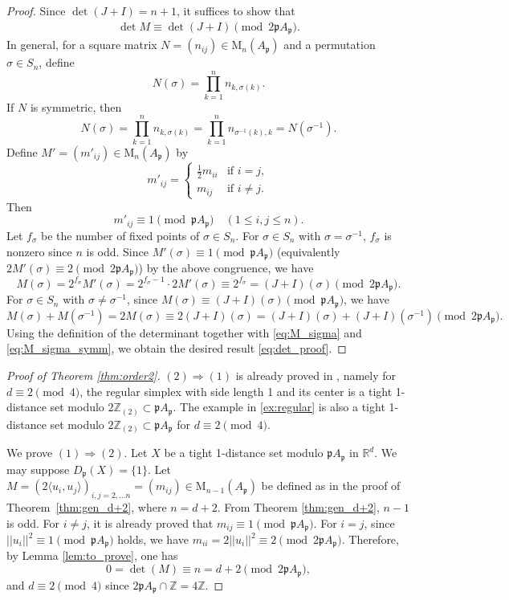\documentclass[a4paper, 11pt]{article}
\newcommand{\R}{\mathbb{R}}
\newcommand{\Z}{\mathbb{Z}}
\newcommand{\p}{\mathfrak{p}}
\newcommand{\la}{\langle}
\newcommand{\ra}{\rangle}
\theoremstyle{definition}
\begin{document}
\begin{proof}
Since $\det(J + I) = n + 1$, it suffices to show that
\begin{align}
\det M \equiv \det(J + I) \pmod{2\p A_{\p}}.
\label{eq:det_proof}
\end{align}
In general, for a square matrix $N = (n_{ij}) \in \mathrm{M}_n(A_{\p})$ and a permutation $\sigma \in S_n$, define
\[
N(\sigma) = \prod_{k=1}^n n_{k,\sigma(k)}.
\]
If $N$ is symmetric, then 
\[
N(\sigma)=\prod_{k=1}^n n_{k,\sigma(k)}
=\prod_{k=1}^n n_{\sigma^{-1}(k),k}=N(\sigma^{-1}).
\]
Define $M' = (m'_{ij}) \in \mathrm{M}_n(A_{\p})$ by
\[
m'_{ij} =
\begin{cases}
\frac{1}{2} m_{ii} & \text{if } i = j,\\
m_{ij} & \text{if } i \ne j. 
\end{cases}
\]
Then
\[
m'_{ij} \equiv 1 \pmod{\p A_{\p}} \quad (1 \leq i, j \leq n).
\]
Let $f_{\sigma}$ be the number of fixed points of $\sigma \in S_n$. 
For $\sigma \in S_n$ with $\sigma = \sigma^{-1}$, $f_{\sigma}$ is nonzero since $n$ is odd. Since $M'(\sigma) \equiv 1 \pmod{\p A_{\p}}$ (equivalently $2M'(\sigma) \equiv 2 \pmod{2\p A_{\p}}$) by the above congruence, we have
\begin{equation}
M(\sigma) = 2^{f_{\sigma}} M'(\sigma)=2^{f_{\sigma}-1}\cdot 2M'(\sigma)  
\equiv 2^{f_{\sigma}} = (J + I)(\sigma)\pmod{2\p A_{\p}}. \label{eq:M_sigma}    
\end{equation}
For $\sigma \in S_n$ with $\sigma \neq \sigma^{-1}$, since $M(\sigma) \equiv (J + I)(\sigma) \pmod{\p A_{\p}}$, we have
\begin{equation}
M(\sigma) + M(\sigma^{-1}) = 2M(\sigma)
\equiv 2(J + I)(\sigma) 
= (J + I)(\sigma) + (J + I)(\sigma^{-1}) \pmod{2\p A_{\p}}. \label{eq:M_sigma_symm}
\end{equation}
Using the definition of the determinant together with \eqref{eq:M_sigma} and \eqref{eq:M_sigma_symm}, we obtain the desired result \eqref{eq:det_proof}.
\end{proof}


\begin{proof}[Proof of Theorem \ref{thm:order2}]
$(2) \Rightarrow (1)$ is already proved in \cite{R97}, namely for $d\equiv 2 \pmod{4}$, the regular simplex with side length 1 and its center is a tight 1-distance set modulo $2\Z_{(2)}\subset \p A_\p$. 
The example in \eqref{ex:regular} is also 
a tight 1-distance set modulo $2 \Z_{(2)}\subset \p A_\p$ for $d\equiv 2 \pmod{4}$. 

We prove $(1) \Rightarrow (2)$. 
Let $X$ be a tight 1-distance set modulo $\p A_\p$ in $\R^d$. 
We may suppose $D_\p(X)=\{1\}$. Let $M=(2\la u_i, u_j \ra)_{i,j=2,\ldots n}=(m_{ij}) \in \mathrm{M}_{n-1}(A_\p)$ be defined as in the proof of Theorem~\ref{thm:gen_d+2}, where $n=d+2$. 
From Theorem \ref{thm:gen_d+2}, $n-1$ is odd. 
For $i\ne j$, it is already proved that $m_{ij}\equiv 1 \pmod{\p A_\p}$.
For $i= j$, since $||u_i||^2 \equiv 1 \pmod{\p A_\p}$ holds, we have  $m_{ii}= 2||u_i||^2 \equiv 2 \pmod{2\p A_\p}$. Therefore, by Lemma \ref{lem:to_prove}, 
 one has  
\[
0=\det(M) \equiv  n =d+2 \pmod{2\p A_\p},
\]
and $d\equiv 2 \pmod{4}$ since $2 \p A_\p \cap \mathbb{Z}=4\mathbb{Z}$. 
\end{proof}
\end{document}

